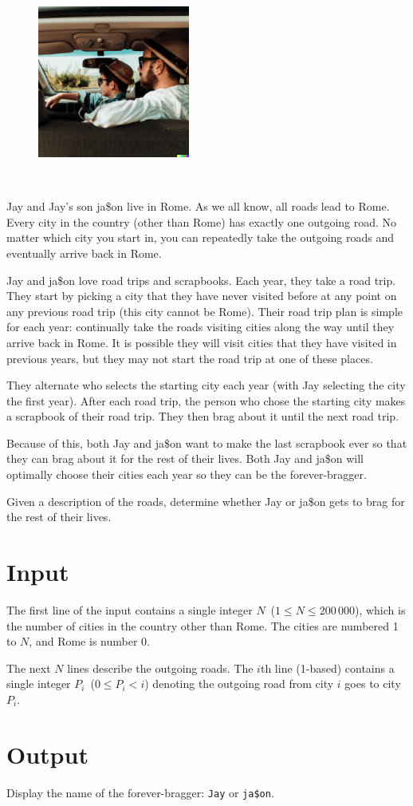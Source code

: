 
\begin{figure}
 \includegraphics[width=50mm]{img.png}
\end{figure}
~

Jay and Jay's son ja\$on live in Rome. As we all know, all roads lead to Rome. Every city in the country (other than Rome) has exactly one outgoing road. No matter which city you start in, you can repeatedly take the outgoing roads and eventually arrive back in Rome.

Jay and ja\$on love road trips and scrapbooks. Each year, they take a road trip. They start by picking a city that they have never visited before at any point on any previous road trip (this city cannot be Rome). Their road trip plan is simple for each year: continually take the roads visiting cities along the way until they arrive back in Rome. It is possible they will visit cities that they have visited in previous years, but they may not start the road trip at one of these places.

They alternate who selects the starting city each year (with Jay selecting the city the first year). After each road trip, the person who chose the starting city makes a scrapbook of their road trip. They then brag about it until the next road trip.

Because of this, both Jay and ja\$on want to make the last scrapbook ever so that they can brag about it for the rest of their lives. Both Jay and ja\$on will optimally choose their cities each year so they can be the forever-bragger.

Given a description of the roads, determine whether Jay or ja\$on gets to brag for the rest of their lives.


\section*{Input}

The first line of the input contains a single integer $N$~($1 \leq N \leq 200\,000$), which is the number of cities in the country other than Rome. The cities are numbered 1 to $N$, and Rome is number 0.

The next $N$ lines describe the outgoing roads. The $i$th line (1-based) contains a single integer $P_i$~($0 \leq P_i < i$) denoting the outgoing road from city $i$ goes to city $P_i$.


\section*{Output}

Display the name of the forever-bragger: \texttt{Jay} or \texttt{ja\$on}.

